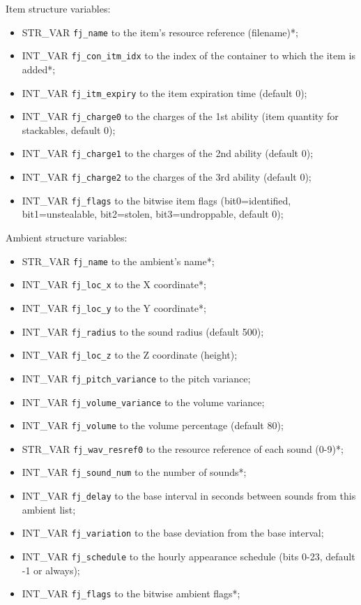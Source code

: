 \documentclass{article}
\begin{document}
Item structure variables:
\begin{itemize}
\item STR_VAR \verb+fj_name+ to the item's resource reference (filename)*;
\item INT_VAR \verb+fj_con_itm_idx+ to the index of the container to which the item is added*;
\item INT_VAR \verb+fj_itm_expiry+ to the item expiration time (default 0);
\item INT_VAR \verb+fj_charge0+ to the charges of the 1st ability (item quantity for stackables, default 0);
\item INT_VAR \verb+fj_charge1+ to the charges of the 2nd ability (default 0);
\item INT_VAR \verb+fj_charge2+ to the charges of the 3rd ability (default 0);
\item INT_VAR \verb+fj_flags+ to the bitwise item flags (bit0=identified, bit1=unstealable, bit2=stolen, bit3=undroppable, default 0);
\end{itemize}
Ambient structure variables:
\begin{itemize}
\item STR_VAR \verb+fj_name+ to the ambient's name*;
\item INT_VAR \verb+fj_loc_x+ to the X coordinate*;
\item INT_VAR \verb+fj_loc_y+ to the Y coordinate*;
\item INT_VAR \verb+fj_radius+ to the sound radius (default 500);
\item INT_VAR \verb+fj_loc_z+ to the Z coordinate (height);
\item INT_VAR \verb+fj_pitch_variance+ to the pitch variance;
\item INT_VAR \verb+fj_volume_variance+ to the volume variance;
\item INT_VAR \verb+fj_volume+ to the volume percentage (default 80);
\item STR_VAR \verb+fj_wav_resref0+ to the resource reference of each sound (0-9)*;
\item INT_VAR \verb+fj_sound_num+ to the number of sounds*;
\item INT_VAR \verb+fj_delay+ to the base interval in seconds between sounds from this ambient list;
\item INT_VAR \verb+fj_variation+ to the base deviation from the base interval;
\item INT_VAR \verb+fj_schedule+ to the hourly appearance schedule (bits 0-23, default -1 or always);
\item INT_VAR \verb+fj_flags+ to the bitwise ambient flags*;
\end{itemize}
\end{document}
